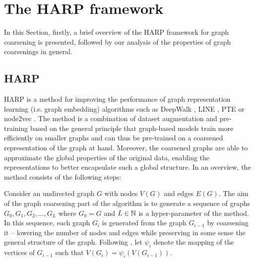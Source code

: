 \section{The HARP framework}

In this Section, firstly, a brief overview of the HARP framework for graph coarsening \cite{chen_harp_2018} is presented, followed by our analysis of the properties of graph coarsenings in general.

\subsection{HARP}\label{sec:harp}
HARP is a method for improving the performance of graph representation learning (i.e. graph embedding) algorithms such as DeepWalk \cite{perozzi_deepwalk_2014}, LINE \cite{tang_line_2015}, PTE \cite{tang_pte_2015} or node2vec \cite{grover_node2vec_2016}. The method is a combination of dataset augmentation and pre-training based on the general principle that graph-based models train more efficiently on smaller graphs and can thus be pre-trained on a coarsened representation of the graph at hand. Moreover, the coarsened graphs are able to approximate the global properties of the original data, enabling the representations to better encapsulate such a global structure. In an overview, the method consists of the following steps:

Consider an undirected graph \( G \) with nodes \( V \left( G \right) \) and edges \( E \left( G \right) \). The aim of the graph coarsening part of the algorithm is to generate a sequence of graphs \( G_0, G_1, G_2, \dots, G_L \) where \( G_0 = G \) and \( L \in \mathbb{N} \) is a hyper-parameter of the method. In this sequence, each graph \( G_i \) is generated from the graph \( G_{i - 1} \) by coarsening it -- lowering the number of nodes and edges while preserving in some sense the general structure of the graph. Following \cite{chen_harp_2018}, let \( \psi_i \) denote the mapping of the vertices of \( G_{i - 1} \) such that \( V \left( G_i \right) = \psi_i \left( V \left( G_{i - 1} \right) \right) \).

